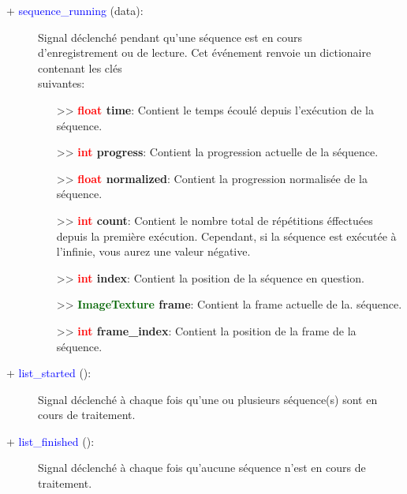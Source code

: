 \documentclass[a4paper, 11pt]{article}
\begin{document}
	\begin{description}
		\item [+ \textcolor{blue}{sequence\_running} (data):] Signal déclenché pendant qu'une séquence est 
		en cours \\d'enregistrement ou de lecture. Cet événement renvoie un dictionaire contenant les clés 
		\\suivantes:
		\begin{itemize}
			\item [>> \textbf{\textcolor{red}{float} time}:] Contient le temps écoulé depuis l'exécution de
			la séquence.
			\item [>> \textbf{\textcolor{red}{int} progress}:] Contient la progression actuelle de la
			séquence.
			\item [>> \textbf{\textcolor{red}{float} normalized}:] Contient la progression normalisée de la
			séquence.
			\item [>> \textbf{\textcolor{red}{int} count}:] Contient le nombre total de répétitions 
			éffectuées depuis la première exécution. Cependant, si la séquence est exécutée à l'infinie, 
			vous aurez une valeur négative.
			\item [>> \textbf{\textcolor{red}{int} index}:] Contient la position de la séquence en question.
			\item [>> \textbf{\textcolor{darkgreen}{ImageTexture} frame}:] Contient la frame actuelle de la.
			séquence.
			\item [>> \textbf{\textcolor{red}{int} frame\_index}:] Contient la position de la frame de la
			séquence.\\
		\end{itemize}
	\end{description}
	\begin{description}
		\item [+ \textcolor{blue}{list\_started} ():] Signal déclenché à chaque fois qu'une ou plusieurs 
		séquence(s) sont en cours de traitement.
	\end{description}
	\begin{description}
		\item [+ \textcolor{blue}{list\_finished} ():] Signal déclenché à chaque fois qu'aucune séquence 
		n'est en cours de \\traitement.
	\end{description}
\end{document}

